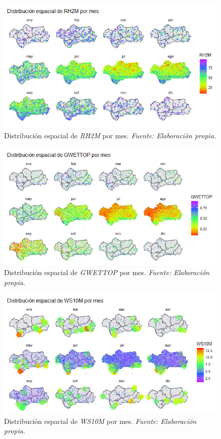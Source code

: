 \documentclass[12pt,a4paper,]{book}
\numberwithin{dummy}{section}
\theoremstyle{ocrenumbox}
\theoremstyle{blacknumex}
\theoremstyle{blacknumbox}
\theoremstyle{ocrenum}
\theoremstyle{ocrenum}
\begin{document}
\begin{figure}[H]
\centering
\includegraphics[width = \textwidth]{graficos/RH2M_spat.png}
\caption[Distribución espacial de \textit{RH2M} por mes]{Distribución espacial de \textit{RH2M} por mes. \it Fuente: Elaboración propia.}
\label{fig:RH2M_spat}
\end{figure}

\begin{figure}[H]
\centering
\includegraphics[width = \textwidth]{graficos/GWETTOP_spat.png}
\caption[Distribución espacial de \textit{GWETTOP} por mes]{Distribución espacial de \textit{GWETTOP} por mes. \it Fuente: Elaboración propia.}
\label{fig:GWETTOP_spat}
\end{figure}

\begin{figure}[H]
\centering
\includegraphics[width = \textwidth]{graficos/WS10M_spat.png}
\caption[Distribución espacial de \textit{WS10M} por mes]{Distribución espacial de \textit{WS10M} por mes. \it Fuente: Elaboración propia.}
\label{fig:WS10M_spat}
\end{figure}
\end{document}
